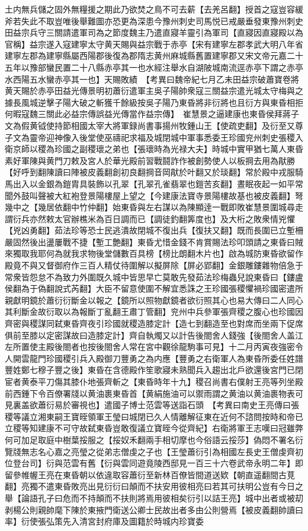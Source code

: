 土内無兵儲之固外無糧援之期此乃欲焚之鳥不可去薪【去羌呂翻】授首之寇豈容緩斧若失此不取豈唯後舉難圖亦恐更為深患今豫州刺史司馬悦已戒嚴垂發東豫州刺史田益宗兵守三關請遣軍司為之節度魏主乃遣直寢羊靈引為軍司【直寢因直寢殿以為官稱】益宗遂入寇建寧太守黄天賜與益宗戰于赤亭【宋有建寧左郡孝武大明八年省建寧左郡為建寧縣屬西陽郡後復為郡隋志黄州麻城縣舊置建寧郡又宋文帝元嘉二十五年以豫部蠻民置二十八縣赤亭其一也水經注舉水自湖陂城南流逕赤亭下謂之赤亭水西陽五水蠻赤亭其一也】天賜敗績　【考異曰魏帝紀七月乙未田益宗破蕭寶卷將黄天賜於赤亭田益光傳景明初蕭衍遣軍主吳子陽帥衆寇三關益宗遣光城太守梅與之據長風城逆擊子陽大破之斬獲千餘級按吳子陽乃東昏將非衍將也且衍方與東昏相拒何暇寇魏三關此必益宗傳誤益光傳當作益宗傳】　崔慧景之逼建康也東昏侯拜蔣子文為假黄钺使持節相國太宰大將軍録尚書事揚州牧鍾山王【使疏吏翻】及衍至又尊子文為靈帝迎神像入後堂使巫禱祀求福及城閉城中軍事悉委王珍國兖州刺史張稷入衛京師以稷為珍國之副稷瓌之弟也【張瓌時為光禄大夫】時城中實甲猶七萬人東昏素好軍陳與黄門刀敕及宮人於華光殿前習戰鬪詐作被創勢使人以板掆去用為猒勝【好呼到翻陳讀曰陣被皮義翻創初良翻掆音岡猒於叶翻又於琰翻】常於殿中戎服騎馬出入以金銀為鎧胄具裝飾以孔翠【孔翠孔雀翡翠也鎧苦亥翻】晝眠夜起一如平常聞外鼓叫聲被大紅袍登景陽樓屋上望之【今建康法寶寺景陽樓故基也被皮義翻】弩幾中之【幾居依翻中竹仲翻】始東昏與左右謀以為陳顯逹一戰即敗崔慧景圍城尋走謂衍兵亦然敕太官辦樵米為百日調而已【調徒釣翻筭度也】及大桁之敗衆情兇懼【兇凶勇翻】茹法珍等恐士民逃潰故閉城不復出兵【復扶又翻】既而長圍已立塹柵嚴固然後出盪屢戰不捷【塹工艶翻】東昏尤惜金錢不肯賞賜法珍叩頭請之東昏曰賊來獨取我耶何為就我求物後堂儲數百具榜【榜比朗翻木片也】啟為城防東昏欲留作殿竟不與又督御府作三百人精仗待圍解以擬屏除【屏必郢翻】金銀雕鏤雜物倍急于常衆皆怨怠不為致力外圍既久城中皆思早亡莫敢先發茹法珍梅蟲兒說東昏曰【鏤盧侯翻為于偽翻說式芮翻】大臣不留意使圍不解宜悉誅之王珍國張稷懼禍珍國密遣所親獻明鏡於蕭衍衍斷金以報之【鏡所以照物獻鏡者欲衍照其心也易大傳曰二人同心其利斷金故衍取以為報斷丁亂翻王肅丁管翻】兖州中兵參軍張齊稷之腹心也珍國因齊密與稷謀同弑東昏齊夜引珍國就稷造膝定計【造七到翻造至也對席而坐兩下促席俱前至膝以定密謀故曰造膝定計】齊自執燭又以計告後閤舍人錢強【後閤舍人盖江左所置使主殿後閤者也按後閤舍人常在宮中觀徐龍駒事可見】十二月丙寅夜強密令人開雲龍門珍國稷引兵入殿御刀豐勇之為内應【豐勇之右衛軍人為東昏所委任姓譜豐姓鄭七穆子豐之後】東昏在含德殿作笙歌寢未熟聞兵入趨出北戶欲還後宮門已閉宦者黄泰平刀傷其膝仆地張齊斬之【東昏時年十九】稷召尚書右僕射王亮等列坐殿前西鍾下令百僚署牋以黄油裹東昏首【黄絹施油可以禦雨謂之黄油以黄油裹物表可見裏盖欲蕭衍易於審視也】遣國子博士范雲等送詣石頭　【考異曰南史王亮傳曰張稷等議立湘東嗣王寶晊領軍王瑩曰城閉已久人情離解征東在近何不諮問按時和帝已立稷等知建康不可守故弑東昏豈敢復議立寶晊今從齊紀】右衛將軍王志嘆曰冠雖弊何可加足取庭中樹葉挼服之【挼奴禾翻兩手相切摩也今俗語云挼莎】偽悶不署名衍覽牋無志名心嘉之亮瑩之從弟志僧虔之子也【王瑩蕭衍引為相國左長史王僧虔齊初位登台司】衍與范雲有舊【衍與雲同遊竟陵西邸見一百三十六卷武帝永明二年】即留參帷幄王亮在東昏朝以依違取容蕭衍至新林百僚皆間道送欵【朝直遥翻間古莧翻】亮獨不遣東昏敗亮出見衍衍曰顛而不扶安用彼相亮曰若其可扶明公豈有今日之舉【論語孔子曰危而不持顛而不扶則將焉用彼相矣衍引以詰王亮】城中出者或被刧剥楊公則親帥麾下陳於東掖門衛送公卿士民故出者多由公則營焉【被皮義翻帥讀曰率】衍使張弘策先入清宮封府庫及圖籍於時城内珍寶委